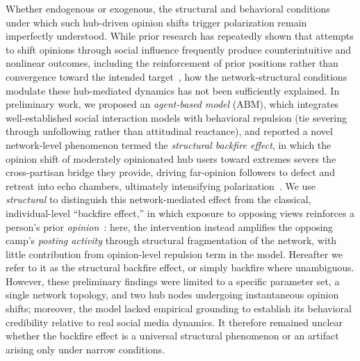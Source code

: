 \documentclass[pdflatex,sn-mathphys-num]{sn-jnl}%
\theoremstyle{thmstyleone}%
\theoremstyle{thmstyletwo}%
\theoremstyle{thmstylethree}%
\begin{document}
Whether endogenous or exogenous, the structural and behavioral conditions under which
such hub-driven opinion shifts trigger polarization remain
imperfectly understood.
While prior research has repeatedly shown that attempts to shift opinions
through social influence frequently produce counterintuitive and nonlinear
outcomes, including the reinforcement of prior positions rather than convergence
toward the intended target~\cite{Brehm1966,Bail2018}, how the network-structural
conditions modulate these hub-mediated dynamics has not been sufficiently explained.
In preliminary work, we proposed an {\em agent-based model} (ABM), which integrates well-established
social interaction models with behavioral repulsion (tie severing through
unfollowing rather than attitudinal reactance), and reported a novel
network-level phenomenon termed the {\em structural backfire effect}, in which the opinion
shift of moderately opinionated hub users toward extremes severs the cross-partisan bridge they
provide, driving far-opinion followers to defect and retreat into echo chambers,
ultimately intensifying polarization~\cite{Takeda2026}.
We use \emph{structural} to distinguish this network-mediated effect from the
classical, individual-level ``backfire effect,'' in which exposure to opposing
views reinforces a person's prior \emph{opinion}~\cite{Brehm1966,Nyhan2021}:
here, the intervention instead amplifies the opposing camp's \emph{posting activity}
through structural fragmentation of the network, with little contribution from opinion-level repulsion
term in the model. Hereafter we refer to it as the structural backfire effect, or
simply backfire where unambiguous.
However, these preliminary findings were limited to a specific parameter set,
a single network topology, and two hub nodes undergoing instantaneous opinion shifts;
moreover, the model lacked empirical grounding to establish its behavioral credibility
relative to real social media dynamics.
It therefore remained unclear whether the backfire effect is a universal structural
phenomenon or an artifact arising only under narrow conditions.
\par
\end{document}

